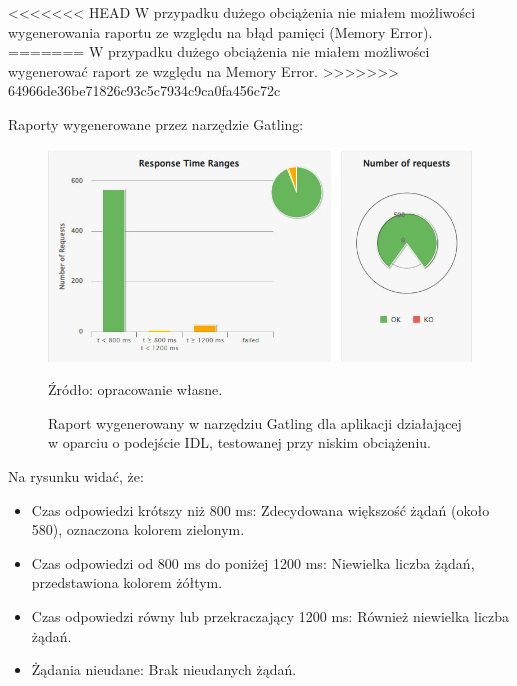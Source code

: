 \documentclass[runningheads,12pt]{llncs}
\begin{document}
<<<<<<< HEAD
W przypadku dużego obciążenia nie miałem możliwości wygenerowania raportu ze względu na błąd pamięci (Memory Error).
=======
W przypadku dużego obciążenia nie miałem możliwości wygenerować raport ze względu na Memory Error.
>>>>>>> 64966de36be71826c93c5c7934c9ca0fa456c72c

\newpage


Raporty wygenerowane przez narzędzie Gatling:

\begin{figure}
    \includegraphics[width=\linewidth]{images/idl-low-gatling-graph.jpg}
    \caption{Raport wygenerowany w narzędziu Gatling dla aplikacji działającej w oparciu o podejście IDL, testowanej przy niskim obciążeniu.} \label{fig1}
    \vspace{0.5em}
    {\small Źródło: opracowanie własne.}
\end{figure}

Na rysunku widać, że:

\begin{itemize}
    \item Czas odpowiedzi krótszy niż 800 ms: Zdecydowana większość żądań (około 580), oznaczona kolorem zielonym.
    \item Czas odpowiedzi od 800 ms do poniżej 1200 ms: Niewielka liczba żądań, przedstawiona kolorem żółtym.
    \item Czas odpowiedzi równy lub przekraczający 1200 ms: Również niewielka liczba żądań.
    \item Żądania nieudane: Brak nieudanych żądań.
\end{itemize}

\newpage
\end{document}
